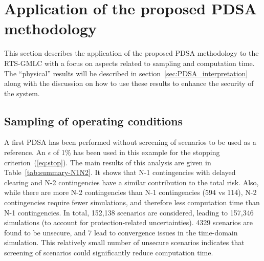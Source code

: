 \section{Application of the proposed PDSA methodology}
\label{sec:PDSA_results}

This section describes the application of the proposed PDSA methodology to the RTS-GMLC with a focus on aspects related to sampling and computation time. The ``physical'' results will be described in section~\ref{sec:PDSA_interpretation} along with the discussion on how to use these results to enhance the security of the system.



\subsection{Sampling of operating conditions}
\label{sec:PDSA_results_sampling}

A first PDSA has been performed without screening of scenarios to be used as a reference. An \(\epsilon\) of 1\% has been used in this example for the stopping criterion~(\ref{eq:stop}). The main results of this analysis are given in Table~\ref{tab:summary-N1N2}. It shows that N-1 contingencies with delayed clearing and N-2 contingencies have a similar contribution to the total risk. Also, while there are more N-2 contingencies than N-1 contingencies (594 vs 114), N-2 contingencies require fewer simulations, and therefore less computation time than N-1 contingencies. In total, 152,138 scenarios are considered, leading to 157,346 simulations (to account for protection-related uncertainties). 4329 scenarios are found to be unsecure, and 7 lead to convergence issues in the time-domain simulation. This relatively small number of unsecure scenarios indicates that screening of scenarios could significantly reduce computation time.

